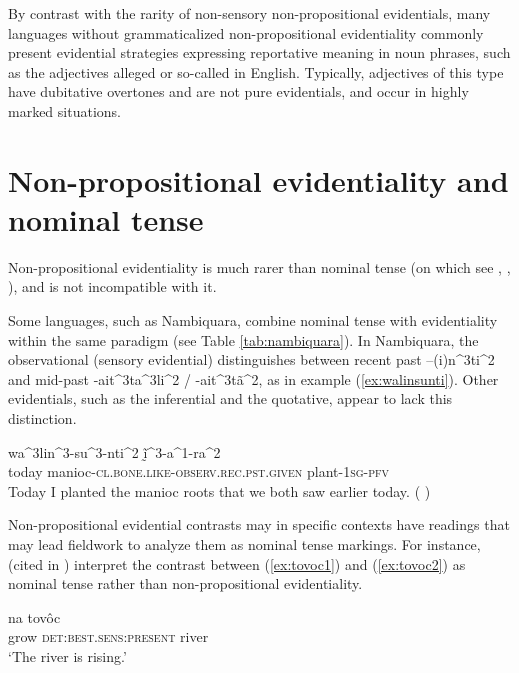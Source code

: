 \documentclass[oneside,a4paper,11pt]{article}
\newcommand{\ipa}[1]{{\phon \mbox{#1}}} %
\begin{document}
By contrast with the rarity of non-sensory non-propositional evidentials, many languages without grammaticalized  non-propositional evidentiality commonly present evidential strategies expressing reportative meaning in noun phrases, such as the adjectives \ipa{alleged} or \ipa{so-called} in English. Typically, adjectives of this type have dubitative overtones and are not pure evidentials, and occur in highly marked situations.

\section{Non-propositional evidentiality and nominal tense} \label{sec:tense}

Non-propositional evidentiality is much rarer than nominal tense (on which see \citealt{nordlinger04nominal}, \citealt{haude04tense}, \citealt[132]{francois05overview}), and is not incompatible with it.


Some languages, such as Nambiquara, combine nominal tense with evidentiality within the same paradigm (see Table \ref{tab:nambiquara}). In Nambiquara,  the observational (sensory evidential)  distinguishes between recent past \ipa{--(i)n^3ti^2} and mid-past \ipa{-ait^3ta^3li^2} /
\ipa{-ait^3tã^2}, as in example (\ref{ex:walinsunti}). Other evidentials, such as the inferential and the quotative, appear to lack this distinction.

\begin{exe}
\ex \label{ex:walinsunti}
\gll  \ipa{hĩ^1na^2su^2} \ipa{wa^3lin^3-su^3-nti^2} \ipa{ḭ̃^3-a^1-ra^2} \\
today manioc-\textsc{cl.bone.like-observ.rec.pst.given} plant-\textsc{1sg-pfv} \\
\glt Today I planted the manioc roots that we both saw earlier today. (\citealt[290, ex 62.]{lowe99nambiquara} ) 
  \end{exe}

Non-propositional evidential contrasts may in specific contexts have readings that may lead fieldwork to analyze them as nominal tense markings. For instance, \citet[631]{campbell12chaco} (cited in \citealt{gutierrez14determiners}) interpret the contrast between (\ref{ex:tovoc1}) and (\ref{ex:tovoc2}) as nominal tense rather than non-propositional evidentiality.

\begin{exe}
\ex \label{ex:tovoc1}
\gll \ipa{tsej} \ipa{na} \ipa{tovôc} \\
  grow \textsc{det:best.sens:present} river \\
\glt `The river is rising.'
\end{exe}
\end{document}
